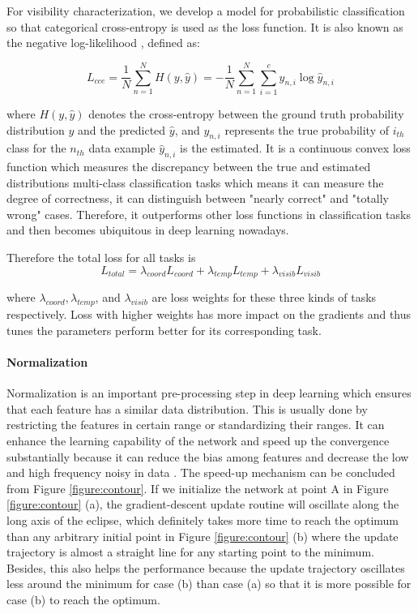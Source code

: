 For visibility characterization, we develop a model for probabilistic classification so that categorical cross-entropy is used as the loss function. It is also known as the negative log-likelihood \cite{Goodfellow-et-al-2016}, defined as:

\begin{equation}
\label{eq11}
L_{cce} =\frac{1}{N} \sum_{n=1}^N H(y,\widehat{y}) = -\frac{1}{N}\sum_{n=1}^N \sum_{i=1}^c y_{n,i} \log \widehat{y}_{n,i}
\end{equation}

where $H(y, \widehat{y})$ denotes the cross-entropy between the ground truth probability distribution $y$ and the predicted $\widehat{y}$, and $y_{n,i} $ represents the true probability of $i_{th}$ class for the $n_{th}$ data example $\widehat{y}_{n,i}$ is the estimated. It is a continuous convex loss function which measures the discrepancy between the true and estimated distributions multi-class classification tasks \cite{DBLP:journals/corr/abs-1802-09941} which means it can measure the degree of correctness, \ie it can distinguish between "nearly correct" and "totally wrong" cases.  Therefore, it outperforms other loss functions in classification tasks and then becomes ubiquitous in deep learning nowadays.

Therefore the total loss for all tasks is
\begin{equation}
\label{eq12}
L_{total} = \lambda_{coord} L_{coord} + \lambda_{temp} L_{temp} + \lambda_{visib} L_{visib}
\end{equation}

where $\lambda_{coord}, \lambda_{temp}$, and $\lambda_{visib}$ are loss weights for these three kinds of tasks respectively. Loss with higher weights has more impact on the gradients and thus tunes the parameters perform better for its corresponding task.

\paragraph{Normalization}
Normalization is an important pre-processing step in deep learning which ensures that each feature has a similar data distribution. This is usually done by restricting the features in certain range or standardizing their ranges. It can enhance the learning capability of the network and speed up the convergence substantially  because it can reduce the bias among features and decrease the low and high frequency noisy in data \cite{Jayalakshmi2011}. The speed-up mechanism can be concluded from Figure \ref{figure:contour}. If we initialize the network at point A in Figure \ref{figure:contour} (a), the gradient-descent update routine will oscillate along the long axis of the eclipse, which definitely takes more time to reach the optimum than any arbitrary initial point in Figure \ref{figure:contour} (b) where the update trajectory is almost a straight line for any starting point  to the minimum. Besides, this also helps the performance because the update trajectory oscillates less around the minimum for case (b) than case (a) so that it is more possible for case (b) to reach the optimum.

